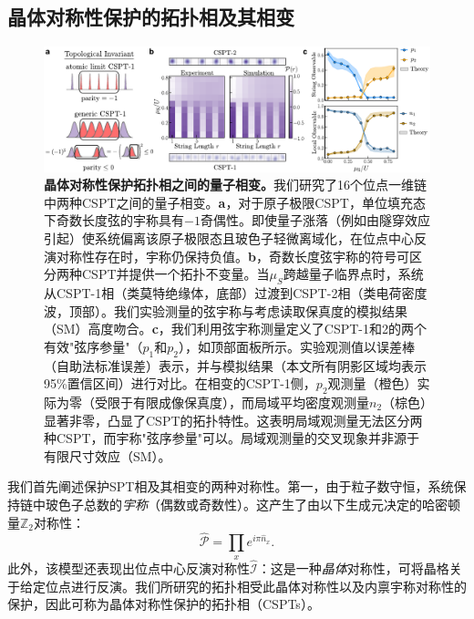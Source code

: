 \documentclass[preprint,superscriptaddress,floatfix, nofootinbib]{revtex4-2}
\begin{document}
\begin{CJK*}{UTF8}{gbsn}
\section{晶体对称性保护的拓扑相及其相变} \label{sec:CSPT-transitions}
\begin{figure}
    \centering
    \includegraphics[width=\textwidth]{figures/Fig_CSPT_ground.pdf}
    \caption{\textbf{晶体对称性保护拓扑相之间的量子相变。}我们研究了16个位点一维链中两种CSPT之间的量子相变。\textbf{a}，对于原子极限CSPT，单位填充态下奇数长度弦的宇称具有$-1$奇偶性。即使量子涨落（例如由隧穿效应引起）使系统偏离该原子极限态且玻色子轻微离域化，在位点中心反演对称性存在时，宇称仍保持负值。\textbf{b}，奇数长度弦宇称的符号可区分两种CSPT并提供一个拓扑不变量。当$\mu_S$跨越量子临界点时，系统从CSPT-1相（类莫特绝缘体，底部）过渡到CSPT-2相（类电荷密度波，顶部）。我们实验测量的弦宇称与考虑读取保真度的模拟结果（SM）高度吻合。\textbf{c}，我们利用弦宇称测量定义了CSPT-1和2的两个有效"弦序参量"（$p_1$和$p_2$），如顶部面板所示。实验观测值以误差棒（自助法标准误差）表示，并与模拟结果（本文所有阴影区域均表示95\%置信区间）进行对比。在相变的CSPT-1侧，$p_2$观测量（橙色）实际为零（受限于有限成像保真度），而局域平均密度观测量$n_2$（棕色）显著非零，凸显了CSPT的拓扑特性。这表明局域观测量无法区分两种CSPT，而宇称"弦序参量"可以。局域观测量的交叉现象并非源于有限尺寸效应（SM）。}
    \label{fig: CSPT_ground}
\end{figure}
我们首先阐述保护SPT相及其相变的两种对称性。第一，由于粒子数守恒，系统保持链中玻色子总数的\textit{宇称}（偶数或奇数性）。这产生了由以下生成元决定的哈密顿量$\mathbb{Z}_2$对称性：
\begin{equation} \label{eq: parity-generator}
 \hat{\mathcal{P}} = \prod_{x} e^{i \pi \hat{n}_x}   .
\end{equation}
此外，该模型还表现出位点中心反演对称性$\hat{\mathcal I}$：这是一种\textit{晶体}对称性，可将晶格关于给定位点进行反演。我们所研究的拓扑相受此晶体对称性以及内禀宇称对称性的保护，因此可称为晶体对称性保护的拓扑相（CSPTs）\cite{Fu11, Turner10inversion, Hughes11, Fuji2015, Song17}。


\end{CJK*}
\end{document}
